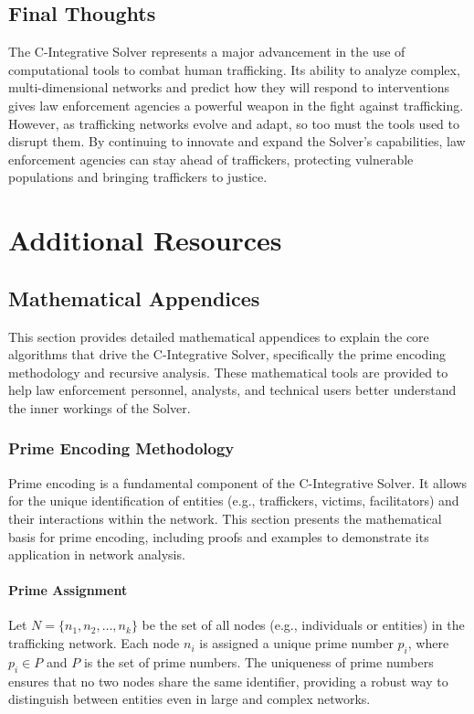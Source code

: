 \documentclass[%
 preprint, linenumbers,
 amsmath,amssymb,
 aps, physrev,
]{revtex4-2}
\begin{document}
\subsection{Final Thoughts}

The C-Integrative Solver represents a major advancement in the use of computational tools to combat human trafficking. Its ability to analyze complex, multi-dimensional networks and predict how they will respond to interventions gives law enforcement agencies a powerful weapon in the fight against trafficking. However, as trafficking networks evolve and adapt, so too must the tools used to disrupt them. By continuing to innovate and expand the Solver’s capabilities, law enforcement agencies can stay ahead of traffickers, protecting vulnerable populations and bringing traffickers to justice.

\section*{Additional Resources}

\subsection*{Mathematical Appendices}

This section provides detailed mathematical appendices to explain the core algorithms that drive the C-Integrative Solver, specifically the prime encoding methodology and recursive analysis. These mathematical tools are provided to help law enforcement personnel, analysts, and technical users better understand the inner workings of the Solver.

\subsubsection*{Prime Encoding Methodology}

Prime encoding is a fundamental component of the C-Integrative Solver. It allows for the unique identification of entities (e.g., traffickers, victims, facilitators) and their interactions within the network. This section presents the mathematical basis for prime encoding, including proofs and examples to demonstrate its application in network analysis.

\paragraph{Prime Assignment}
Let \( N = \{n_1, n_2, \dots, n_k\} \) be the set of all nodes (e.g., individuals or entities) in the trafficking network. Each node \( n_i \) is assigned a unique prime number \( p_i \), where \( p_i \in P \) and \( P \) is the set of prime numbers. The uniqueness of prime numbers ensures that no two nodes share the same identifier, providing a robust way to distinguish between entities even in large and complex networks.
\end{document}
